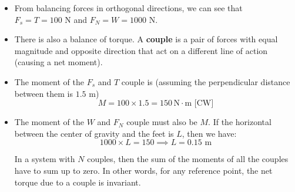 \begin{itemize}
\begin{center}
\end{center}
\item From balancing forces in orthogonal directions, we can see that $F_s=T=100 \text{ N}$ and $F_N=W=1000 \text{ N}$.
\item There is also a balance of torque. A \textbf{couple} is a pair of forces with equal magnitude and opposite direction that act on a different line of action (causing a net moment).
\item The moment of the $F_s$ and $T$ couple is (assuming the perpendicular distance between them is $1.5 \text{ m}$)
\begin{equation}
    M= 100 \times 1.5=150 \,\mathrm{N\cdot m} \text{ [CW]}
    \label{eq:}
\end{equation}
\item The moment of the $W$ and $F_N$ couple must also be $M$. If the horizontal between the center of gravity and the feet is $L$, then we have:
\begin{equation}
    1000 \times L = 150 \implies L = 0.15 \text{ m}
    \label{eq:}
\end{equation}

\begin{theorem}
    In a system with $N$ couples, then the sum of the moments of all the couples have to sum up to zero. In other words, for any reference point, the net torque due to a couple is invariant.
    \vspace{2mm}


\end{theorem}
\end{itemize}
